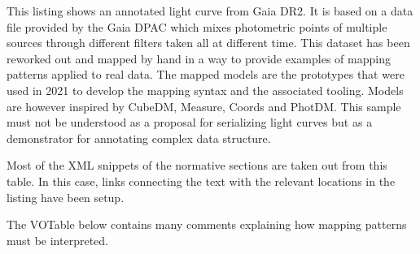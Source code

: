 This listing shows an annotated light curve from Gaia DR2. 
It is based on a data file provided by the Gaia DPAC which mixes photometric points of multiple sources 
through different filters taken all at different time.
This dataset has been reworked out and mapped by hand in a way to provide examples of mapping patterns 
applied to real data.
The mapped models are the prototypes that were used in 2021 to develop the mapping syntax 
and the associated tooling. Models are however inspired by CubeDM, Measure, Coords and PhotDM.
This sample must not be understood as a proposal for serializing light curves but as a demonstrator for annotating complex
data structure.

Most of the XML snippets of the normative sections are taken out from this table. 
In this case, links connecting the text with the relevant locations in the listing have been setup.

The VOTable below contains many comments explaining how mapping patterns must be interpreted.


